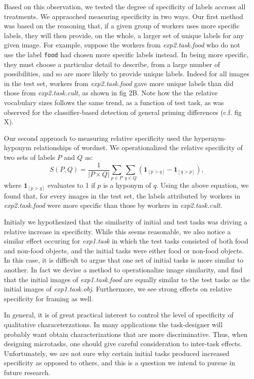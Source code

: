 \documentclass[12pt]{article}
\begin{document}
Based on this observation, we tested the degree of specificity of labels 
accross all treatments.  We appraoched measuring specificity in two ways.
Our first method was based on the reasoning that, if a given group of 
workers uses more specific labels, they will then provide, on the whole,
a larger set of unique labels for any given image.  For example,
suppose the workers from \textit{exp2.task.food} who do not use the label 
\texttt{food} had chosen more specific labels instead.  In being more 
specific, they must choose a particular detail to describe, from a large 
number of possibilities, and so are more likely to provide unique labels.
Indeed
for all images in the test set, workers from \textit{exp2.task.food} gave
more unique labels than did those from \textit{exp2.task.cult}, as shown 
in fig 2B.  Note how the the relative vocabulary sizes follows
the same trend, as a function of test task, as was observed for the 
classifier-based detection of general priming differences (c.f. fig X).

Our second approach to measuring relative specificity used the 
hypernym-hyponym relationships of wordnet.
We operationalized the relative specificity of two sets of labels $P$ 
and $Q$ as:
$$
	S(P,Q) = \frac{1}{|P \times Q|}\sum_{p \in P} \sum_{q \in Q} 
		\left(\mathbf{1}_{[p>q]} - \mathbf{1}_{[q>p]}\right),
$$
where $\mathbf{1}_{[p>q]}$ evaluates to 1 if $p$ is a hyponym of $q$.
Using the above equation, we found that, for every images in the 
test set, the labels attributed by workers in \textit{exp2.task.food} were 
more specific than those by workers in \textit{exp2.task.cult}.

Initialy we hypothesized that the similarity of initial and test tasks was
driving a relative increase in specificity.  While this seems reasonable,
we also notice a similar effect occuring for \textit{exp1.task} in which
the test tasks consisted of both food and non-food objects, and the initial
tasks were either food or non-food objects.  In this case, it is difficult
to argue that one set of initial tasks is more similar to another.  In fact
we devise a method to operationalize image similarity, and find that 
the initial images of \textit{exp1.task.food} are equally similar to the
test tasks as the initial images of \textit{exp1.task.obj}.  Furthermore,
we see strong effects on relative specificity for framing as well.

In general, it is of great practical interest to control the level of 
specificity of qualitative characeterzations.  In many applications the
task-designer will probably want obtain characterizations that are more
discriminative.  Thus, when designing microtasks, one should give careful
consideration to inter-task effects.  Unfortunately, we are not sure
why certain initial tasks produced increased specificity as opposed to others, 
and this is a question we intend to pursue in future research.
\end{document}
